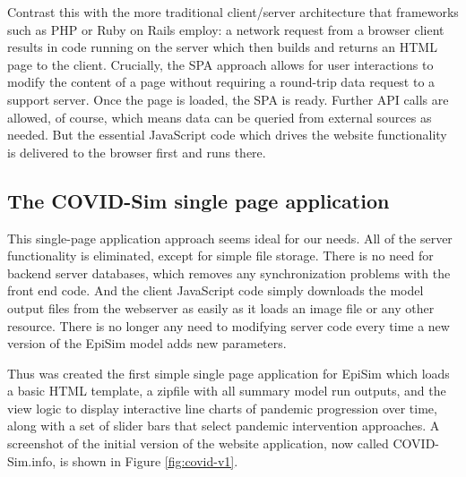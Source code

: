 Contrast this with the more traditional client/server architecture that frameworks such as PHP or Ruby on Rails employ: a network request from a browser client results in code running on the server which then builds and returns an HTML page to the client. Crucially, the SPA approach allows for user interactions to modify the content of a page without requiring a round-trip data request to a support server. Once the page is loaded, the SPA is ready. Further API calls are allowed, of course, which means data can be queried from external sources as needed. But the essential JavaScript code which drives the website functionality is delivered to the browser first and runs there.

\hypertarget{covid-single-page-application}{%
\subsection{The COVID-Sim single page application}\label{covid-single-page-application}}

This single-page application approach seems ideal for our needs. All of the server functionality is eliminated, except for simple file storage. There is no need for backend server databases, which removes any synchronization problems with the front end code. And the client JavaScript code simply downloads the model output files from the webserver as easily as it loads an image file or any other resource. There is no longer any need to modifying server code every time a new version of the EpiSim model adds new parameters.

Thus was created the first simple single page application for EpiSim which loads a basic HTML template, a zipfile with all summary model run outputs, and the view logic to display interactive line charts of pandemic progression over time, along with a set of slider bars that select pandemic intervention approaches. A screenshot of the initial version of the website application, now called COVID-Sim.info, is shown in Figure \ref{fig:covid-v1}.

